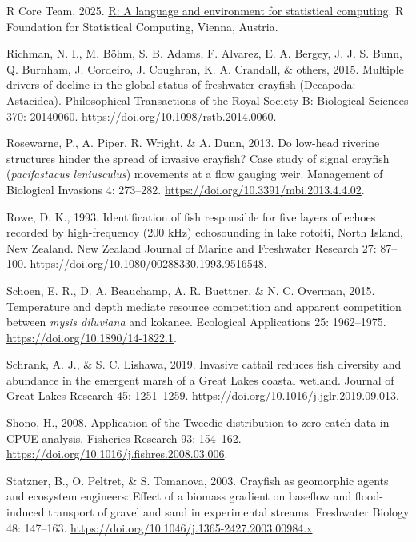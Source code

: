 \documentclass[
  letterpaper,
  DIV=11,
  numbers=noendperiod]{scrartcl}
\newlength{\cslhangindent}
\newenvironment{CSLReferences}[2] %
 {\begin{list}{}{%
  \setlength{\itemindent}{0pt}
  \setlength{\leftmargin}{0pt}
  \setlength{\parsep}{0pt}
  \ifodd #1
   \setlength{\leftmargin}{\cslhangindent}
   \setlength{\itemindent}{-1\cslhangindent}
  \fi
  \setlength{\itemsep}{#2\baselineskip}}}
 {\end{list}}
\begin{document}
\begin{CSLReferences}{0}{1}
R Core Team, 2025. \href{https://www.R-project.org/}{{R}: A language and
environment for statistical computing}. R Foundation for Statistical
Computing, Vienna, Austria.

{Richman, N. I., M. Böhm, S. B. Adams, F. Alvarez, E. A. Bergey, J. J.
S. Bunn, Q. Burnham, J. Cordeiro, J. Coughran, K. A. Crandall, \&
others}, 2015. Multiple drivers of decline in the global status of
freshwater crayfish ({Decapoda}: {Astacidea}). Philosophical
Transactions of the Royal Society B: Biological Sciences 370: 20140060.
\url{https://doi.org/10.1098/rstb.2014.0060}.

Rosewarne, P., A. Piper, R. Wright, \& A. Dunn, 2013. Do low-head
riverine structures hinder the spread of invasive crayfish? Case study
of signal crayfish (\emph{pacifastacus leniusculus}) movements at a flow
gauging weir. Management of Biological Invasions 4: 273--282.
\url{https://doi.org/10.3391/mbi.2013.4.4.02}.

Rowe, D. K., 1993. Identification of fish responsible for five layers of
echoes recorded by high-frequency (200 kHz) echosounding in lake
rotoiti, {North Island, New Zealand}. New Zealand Journal of Marine and
Freshwater Research 27: 87--100.
\url{https://doi.org/10.1080/00288330.1993.9516548}.

Schoen, E. R., D. A. Beauchamp, A. R. Buettner, \& N. C. Overman, 2015.
Temperature and depth mediate resource competition and apparent
competition between \emph{mysis diluviana} and kokanee. Ecological
Applications 25: 1962--1975. \url{https://doi.org/10.1890/14-1822.1}.

Schrank, A. J., \& S. C. Lishawa, 2019. Invasive cattail reduces fish
diversity and abundance in the emergent marsh of a {Great Lakes} coastal
wetland. Journal of Great Lakes Research 45: 1251--1259.
\url{https://doi.org/10.1016/j.jglr.2019.09.013}.

Shono, H., 2008. Application of the {Tweedie} distribution to zero-catch
data in {CPUE} analysis. Fisheries Research 93: 154--162.
\url{https://doi.org/10.1016/j.fishres.2008.03.006}.

Statzner, B., O. Peltret, \& S. Tomanova, 2003. Crayfish as geomorphic
agents and ecosystem engineers: Effect of a biomass gradient on baseflow
and flood-induced transport of gravel and sand in experimental streams.
Freshwater Biology 48: 147--163.
\url{https://doi.org/10.1046/j.1365-2427.2003.00984.x}.


\end{CSLReferences}
\end{document}
